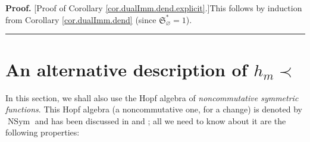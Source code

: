 \documentclass[numbers=enddot,12pt,final,onecolumn,notitlepage,abstracton]{scrartcl}%
\theoremstyle{definition}
\newenvironment{proof}[1][Proof]{\noindent\textbf{#1.} }{\ \rule{0.5em}{0.5em}}
\newenvironment{vershort}{}{}
\begin{document}
\begin{vershort}
\begin{proof}
[Proof of Corollary \ref{cor.dualImm.dend.explicit}.]This follows by induction
from Corollary \ref{cor.dualImm.dend} (since $\mathfrak{S}_{\varnothing}%
^{\ast}=1$).
\end{proof}
\end{vershort}

\section{\label{sect.zabrocki}An alternative description of $h_{m}\left.
\prec\right.  $}

In this section, we shall also use the Hopf algebra of \textit{noncommutative
symmetric functions}. This Hopf algebra (a noncommutative one, for a change)
is denoted by $\operatorname*{NSym}$ and has been discussed in \cite[Section
5.4]{Reiner} and \cite[Chapter 6]{HGK}; all we need to know about it are the
following properties:
\end{document}
